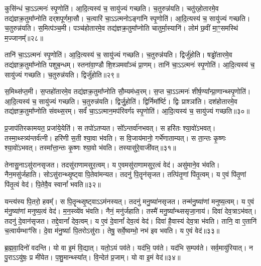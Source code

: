 कुसि॑न्धं चा॒ऽऽत्मनः॑ स्पृ॒णोति॑।
आ॒दि॒त्यस्य॑ च॒ सायु॑ज्यं गच्छति।
च॒तुरुन्न॑यति।
चतु॑र्‌\mbox{}होतारमे॒व तद्य॑ज्ञक्र॒तुमा᳚प्नोति दर्‌\mbox{}श\-पूर्ण\-मा॒सौ।
च॒त्वारि॑ चा॒ऽऽत्मनो\-ऽङ्गा॑नि स्पृ॒णोति॑।
आ॒दि॒त्यस्य॑ च॒ सायु॑ज्यं गच्छति।
च॒तुरुन्न॑यति।
स॒मित्प॑ञ्च॒मी।
पञ्च॑होतारमे॒व तद्य॑ज्ञ\-क्र॒तुमा᳚प्नोति चातुर्मा॒स्यानि॑।
लोम॑ छ॒वीं मा॒ꣳ॒समस्थि॑ म॒ज्जानम्᳚॥२८॥

तानि॑ चा॒ऽऽत्मनः॑ स्पृ॒णोति॑।
आ॒दि॒त्यस्य॑ च॒ सायु॑ज्यं गच्छति।
च॒तुरुन्न॑यति।
द्विर्जु॑होति।
षड्ढो॑तारमे॒व तद्य॑ज्ञक्र॒तुमा᳚प्नोति पशुब॒न्धम्।
स्तना॑वा॒ण्डौ शि॒श्ञमवा᳚ञ्चं प्रा॒णम्।
तानि॑ चा॒ऽऽत्मनः॑ स्पृ॒णोति॑।
आ॒दि॒त्यस्य॑ च॒ सायु॑ज्यं गच्छति।
च॒तुरुन्न॑यति।
द्विर्जु॑होति॥२९॥

स॒मिथ्स॑प्त॒मी।
स॒प्तहो॑तारमे॒व तद्य॑ज्ञक्र॒तुमा᳚प्नोति सौ॒म्यम॑ध्व॒रम्।
स॒प्त चा॒ऽऽत्मनः॑ शीर्\mbox{}ष॒ण्या᳚न्प्रा॒णान्थ्स्पृ॒णोति॑।
आ॒दि॒त्यस्य॑ च॒ सायु॑ज्यं गच्छति।
च॒तुरुन्न॑यति।
द्विर्जु॒होति॑।
द्विर्निमा᳚र्ष्टि।
द्विः प्राश्ञा॑ति।
दश॑होतारमे॒व तद्य॑ज्ञक्र॒तुमा᳚प्नोति संवथ्स॒रम्।
सर्वं॑ चा॒\-ऽ\-ऽ\-त्मान॒\-मप॑रि\-वर्गꣴ स्पृ॒णोति॑।
आ॒दि॒त्यस्य॑ च॒ सायु॑ज्यं गच्छति॥३०॥\anuvakamend[अ॒ग्नि॒हो॒त्रं म॒ज्जान॒न्द्विर्जु॑हो॒त्यप॑रिवर्गꣴ स्पृ॒णोत्येकं॑ च]

प्र॒जा\-प॑तिरकामयत॒ प्रजा॑ये॒येति॑।
स तपो॑\-ऽतप्यत।
सो᳚ऽन्तर्वा॑नभवत्।
स हरि॑तः श्या॒वो॑\-ऽभवत्।
तस्मा॒थ्स्त्र्य॑न्तर्व॑त्नी।
हरि॑णी स॒ती श्या॒वा भ॑वति।
स वि॒जाय॑मानो॒ गर्भे॑णाताम्यत्।
स ता॒न्तः कृ॒ष्णः श्या॒वो॑\-ऽभवत्।
तस्मा᳚त्ता॒न्तः कृ॒ष्णः श्या॒वो भ॑वति।
तस्यासु॑रे॒वाजी॑वत्॥३१॥

तेनासु॒ना\-ऽसु॑रान\-सृजत।
तदसु॑राणा\-मसुर॒\-त्वम्।
य ए॒वम\-सु॑राणा\-मसुर॒\-त्वं वेद॑।
असु॑माने॒व भ॑वति।
नैन॒\-मसु॑र्जहाति।
सो\-ऽ\-सु॑रान्थ्सृ॒ष्ट्वा पि॒तेवा॑\-मन्यत।
तदनु॑ पि॒तॄन॑\-सृजत।
तत्पि॑तृ॒णां पि॑तृ॒\-त्वम्।
य ए॒वं पि॑तृ॒णां पि॑तृ॒\-त्वं वेद॑।
पि॒तेवै॒व स्वानां᳚ भवति॥३२॥

यन्त्य॑स्य पि॒तरो॒ हवम्᳚।
स पि॒तॄन्थ्सृ॒ष्ट्वा\-ऽऽम॑नस्यत्।
तदनु॑ मनु॒ष्या॑न\-सृजत।
तन्म॑नु॒ष्या॑णां मनुष्य॒त्वम्।
य ए॒वं म॑नु॒ष्या॑णां मनुष्य॒त्वं वेद॑।
म॒न॒स्व्ये॑व भ॑वति।
नैनं॒ मनु॑र्जहाति।
तस्मै॑ मनु॒ष्या᳚न्थ्ससृजा॒नाय॑।
दिवा॑ देव॒त्रा\-ऽभ॑वत्।
तदनु॑ दे॒वान॑\-सृजत।
तद्दे॒वानां᳚ देव॒त्वम्।
य ए॒वं दे॒वानां᳚ देव॒त्वं वेद॑।
दिवा॑ है॒वास्य॑ देव॒त्रा भ॑वति।
तानि॒ वा ए॒तानि॑ च॒त्वार्यम्भाꣳ॑सि।
दे॒वा म॑नु॒ष्याः᳚ पि॒तरो\-ऽसु॑राः।
तेषु॒ सर्वे॒ष्वम्भो॒ नभ॑ इव भवति।
य ए॒वं वेद॑॥३३॥\anuvakamend[अ॒जी॒व॒थ्स्वानां᳚ भवति दे॒वान॑\-सृजत स॒प्त च॑]

ब्र॒ह्म॒वा॒दिनो॑ वदन्ति।
यो वा इ॒मं वि॒द्यात्।
यतो॒ऽयं पव॑ते।
यद॑भि॒ पव॑ते।
यद॑भि स॒म्पव॑ते।
सर्व॒मायु॑रियात्।
न पु॒रा\-ऽऽयु॑षः॒ प्र मी॑येत।
प॒शु॒मान्थ्स्या᳚त्।
वि॒न्देत॑ प्र॒जाम्।
यो वा इ॒मं वेद॑॥३४॥

